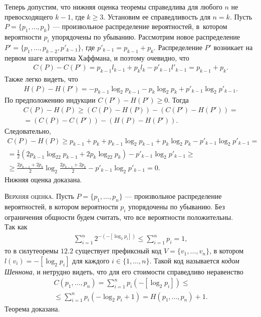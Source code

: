 \documentclass[12pt]{article}
\numberwithin{equation}{section}
\begin{document}
Теперь допустим, что нижняя оценка теоремы справедлива для любого $n$ не превосходящего $k-1$, где $k \ge 3$. Установим ее справедливость для $n= k$. Пусть $P
=\{p_1,\dots,p_k\}$ — произвольное распределение вероятностей, в~котором вероятности $p_i$ упорядочены по убыванию. Рассмотрим новое распределение $P' = \{p_1,\dots,p_{k-2}, p'_{k-1}\}$, где $p'_{k-1} =p_{k-1}+p_k.$ Распределение $P'$ возникает на первом шаге алгоритма Хаффмана, и поэтому очевидно, что\\
\begin{align*}
C(P)-C(P')=p_{k-1}l_{k-1}+p_kl_k-p'_{k-1}l'_{k-1}=
p_{k-1}+p_k.
\end{align*}
Также легко видеть, что
\begin{align*}
H(P)-H(P')=-p_{k-1}\log_2p_{k-1}-p_k\log_2p_k+p'_{k-1}\log_2p'_{k-1}.
\end{align*}
По предположению индукции $C(P')-H(P')\ge0$. Тогда
\begin{align*}
C(P)-H(P)\ge(C(P)-H(P))-(C(P')-H(P'))=\\
=(C(P)-C(P'))-(H(P)-H(P')).
\end{align*}
Следовательно,
\begin{align*}
C(P)-H(P)\ge p_{k-1}+p_k+p_{k-1}\log_2p_{k-1}+p_k\log_2p_k-p'_{k-1}\log_2p'_{k-1}=\\
=\frac{1}{2}(2p_{k-1}\log_22p_{k-1}+2p_k\log_22p_k)-p'_{k-1}\log_2p'_{k-1}\ge\\
\ge \frac{2p_{k-1}+2p_k}{2}\log_2\frac{2p_{k-1}+2p_k}{2}-p'_{k-1}\log_2p'_{k-1}=0.
\end{align*}
Нижняя оценка доказана.

\textsc{Верхняя оценка.} Пусть $P= \{p_1,\dots,p_n\}$ — произвольное распределение вероятностей, в котором вероятности $p_i$ упорядочены по убыванию. Без ограничения общности будем считать, что все вероятности положительны.\\
Так как
\begin{align*}
\sum_{i=1}^{n}2^{-(-[\log_2p_i])}\le\sum_{i=1}^{n}p_i=1,
\end{align*}
то в силутеоремы $12.2$ существует префиксный код $V=\{v_1,\dots,v_n\}$, в
котором $l(v_i)=-[\log_2p_i]$ для каждого $i\in\{1,\dots,n\}$. Такой код называется
\textit{кодом Шеннона}, и нетрудно видеть, что для его стоимости справедливо неравенство
\begin{align*}
C(p_1,\dots,p_n)=\sum_{i=1}^{n}p_i(-[\log_2p_i])\le\\
\le \sum_{i=1}^{n}p_i(-\log_2p_i+1)=H(p_1,\dots,p_n)+1.
\end{align*}
Теорема доказана.
\end{document}
